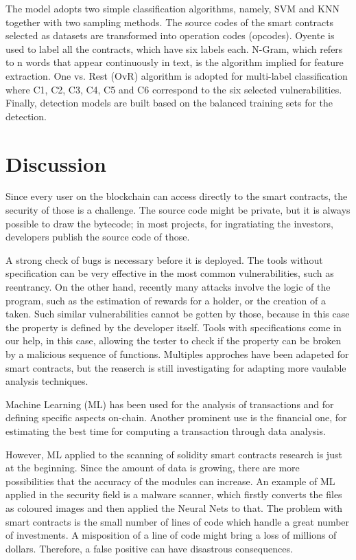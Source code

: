 \documentclass[a4paper,sigconf, language=french,
language=german, language=spanish, language=english]{acmart}
\begin{document}
The model adopts two simple classification algorithms, namely, SVM and KNN together with two sampling methods.
The source codes of the smart contracts selected as datasets are transformed into operation codes (opcodes). Oyente is used to label all the contracts, which have six labels each.  N-Gram, which refers to n words that appear
continuously in text, is the algorithm implied for feature extraction.
One vs. Rest (OvR) algorithm is adopted for multi-label classification where
C1, C2, C3, C4, C5 and C6 correspond to the six selected vulnerabilities. 
Finally, detection models are built based on the balanced
training sets for the detection.

\section{Discussion}
\label{Discussion}

Since every user on the blockchain can access directly to the smart contracts, the security of those is a challenge. The source code might be private, but it is always possible to draw the bytecode; in most projects, for ingratiating the investors, developers publish the source code of those.  

A strong check of bugs is necessary before it is deployed. The tools without specification can be very effective in the most common vulnerabilities, such as reentrancy. On the other hand, recently many attacks involve the logic of the program, such as the estimation of rewards for a holder, or the creation of a taken. Such similar vulnerabilities cannot be gotten by those, because in this case the property is defined by the developer itself. Tools with specifications come in our help, in this case, allowing the tester to check if the property can be broken by a malicious sequence of functions. Multiples approches have been adapeted for smart contracts, but the reaserch is still investigating for adapting more vaulable analysis techniques.

Machine Learning (ML) has been used for the analysis of transactions and for defining specific aspects on-chain. Another prominent use is the financial one, for estimating the best time for computing a transaction through data analysis.

However, ML applied to the scanning of solidity smart contracts research is just at the beginning. Since the amount of data is growing, there are more possibilities that the accuracy of the modules can increase.  An example of ML applied in the security field is a malware scanner, which firstly converts the files as coloured images and then applied the Neural Nets to that. The problem with smart contracts is the small number of lines of code which handle a great number of investments. A misposition of a line of code might bring a loss of millions of dollars. Therefore, a false positive can have disastrous consequences.
\end{document}
